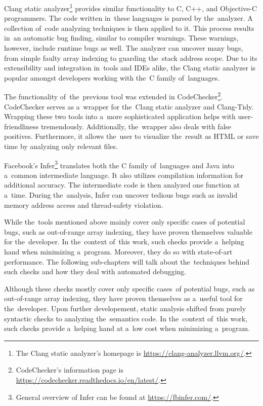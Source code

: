Clang static analyzer\footnote{The Clang static analyzer's 
homepage is \url{https://clang-analyzer.llvm.org/}.} provides 
similar functionality to C, C++, and 
Ob\-jec\-tive-C programmers.
The code written in~these languages is parsed by the~ana\-ly\-zer.
A collection of~code analyzing techniques is then applied to it.
This process results in~an automatic bug finding, similar to compiler 
warnings.
These war\-nings, however, include runtime bugs as well.
The analyzer can uncover many bugs, from simple faulty array 
indexing to guarding the~stack address scope.
Due to its extensibility and integration in~tools and IDEs alike, 
the Clang static analyzer is popular amongst developers working 
with the~C family of~languages.

The functionality of~the~previous tool was extended 
in CodeChecker\footnote{CodeChecker's information
page is \url{https://codechecker.readthedocs.io/en/latest/}.}.
Code\-Check\-er serves as a~wrapper for the~Clang static analyzer and 
Clang-Tidy.
Wrapping these two tools into a~more sophisticated application helps 
with user-friend\-li\-ness tremendously.
Additionally, the~wrapper also deals with false positives.
Furthermore, it allows the~user to visualize the~result as HTML or 
save time by analyzing only relevant files.

Facebook's Infer\footnote{General overview of Infer can be found at 
\url{https://fbinfer.com/}.} translates both 
the C family of~languages and Java 
into a~common intermediate language.
It also utilizes compilation information for add\-itional accuracy.
The intermediate code is then analyzed one function at a~time.
During the~analysis, Infer can uncover tedious bugs such as invalid 
memory address access and thread-safety violation.

While the~tools mentioned above mainly cover only specific cases 
of potential bugs, such as out-of-range array indexing, they 
have proven themselves valuable for the~developer.
In the~context of~this work, such checks provide a~helping hand 
when minimizing a~program. Moreover, they do so with state-of-art
performance.
The following sub-chapters will talk about the~techniques behind 
such checks and how they deal with automated debugging.

Although these checks mostly cover only specific 
cases~of potential bugs, such as out-of-range array indexing, they have proven 
themselves as a~useful tool for the~developer.
Upon further developement, static analysis shifted from purely syntactic
checks to analyzing the~semantics code.
In the~context of~this work, such checks provide a~helping hand 
at a~low cost when minimizing a~program. 

